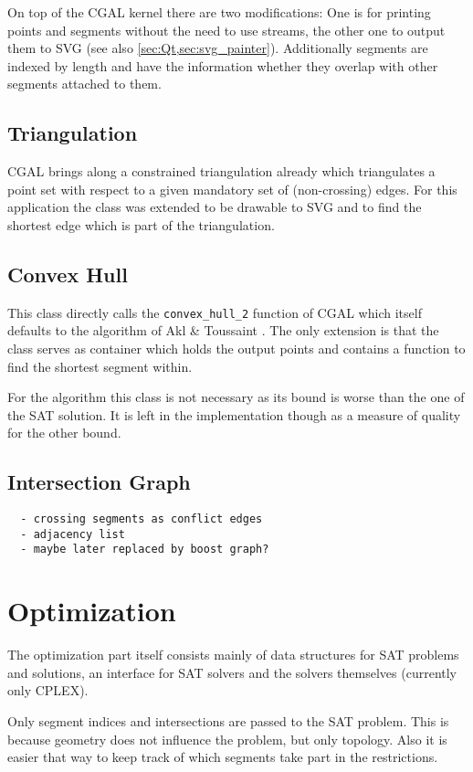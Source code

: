 On top of the CGAL kernel there are two modifications: One is for
printing points and segments without the need to use streams, the
other one to output them to SVG (see also
\cref{sec:Qt,sec:svg_painter}). Additionally segments are indexed by
length and have the information whether they overlap with other
segments attached to them.

\subsection{Triangulation}
CGAL brings along a constrained triangulation already
\cite{cgal_manual_constrained_triangulation}
which triangulates a point set with respect to a given mandatory set
of (non-crossing) edges. For this application the class was extended
to be drawable to SVG and to find the shortest edge which is part of
the triangulation.

\subsection{Convex Hull}
This class directly calls the \verb|convex_hull_2| function of CGAL
\cite{cgal_manual_convex_hull} which itself defaults to the algorithm
of Akl \& Toussaint \cite{convex_hull}. The only extension is that
the class serves as container
which holds the output points and contains a function to find the 
shortest segment within.

For the algorithm this class is not necessary as its bound is worse
than the one of the SAT solution. It is left in the implementation
though as a measure of quality for the other bound.

\subsection{Intersection Graph}
\begin{verbatim}
  - crossing segments as conflict edges
  - adjacency list
  - maybe later replaced by boost graph?
\end{verbatim}

\section{Optimization}
The optimization part itself consists mainly of data structures for
SAT problems and solutions, an interface for SAT solvers and the
solvers themselves (currently only CPLEX).

Only segment indices and intersections are passed to the SAT problem.
This is because geometry does not influence the problem, but only
topology. Also it is easier that way to keep track of which segments
take part in the restrictions.

